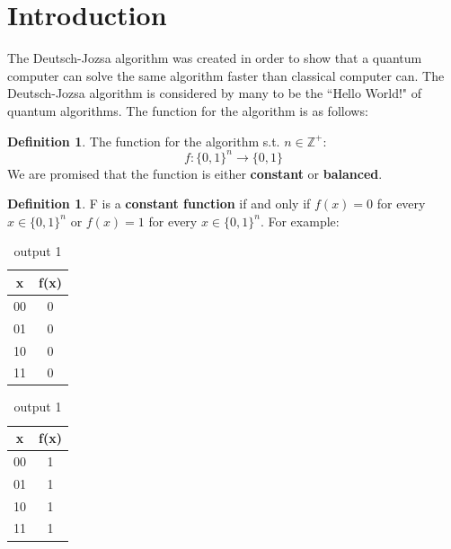 \documentclass[12pt]{article}
\theoremstyle{definition}
\newtheorem{definition}[theorem]{Definition}
\begin{document}
 \section{Introduction}
 \noindent The Deutsch-Jozsa algorithm was created in order to show that a quantum computer can solve the same algorithm faster than classical computer can. The Deutsch-Jozsa algorithm is considered by many to be the ``Hello World!" of quantum algorithms. The function for the algorithm is as follows:
 \begin{definition}
 The function for the algorithm s.t. $n\in\mathbb{Z^+}$:
 \[f: \{0,1\}^n\longrightarrow\{0,1\}\]
 We are promised that the function is either \textbf{constant} or \textbf{balanced}.
 \end{definition}
 \vspace{.2 in}
 \begin{definition}
 F is a \textbf{constant function} if and only if $f(x) = 0$ for every $x\in\{0,1\}^n$ or $f(x) = 1$ for every $x\in\{0,1\}^n$. For example:
 
\begin{table}[H]
    \begin{minipage}{.5\linewidth}
      \centering
        \begin{tabular}{|c|c|}
           \hline
            x&f(x)\\
            \hline
            00 & 0  \\  
            01 & 0 \\
            10 & 0 \\
            11 & 0 \\
            \hline
        \end{tabular}
        \caption{output 0}
    \end{minipage}%
    \begin{minipage}{.5\linewidth}
      \centering
        
        \begin{tabular}{|c|c|}
         \hline
            x&f(x)\\
            \hline
            00 & 1  \\  
            01 & 1 \\
            10 & 1 \\
            11 & 1 \\
            \hline
        \end{tabular}
        \caption{output 1}
    \end{minipage} 
\end{table}

\end{definition}
\end{document}
